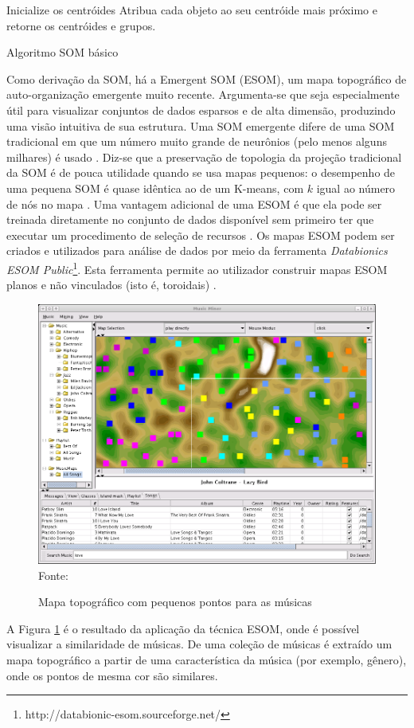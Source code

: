 \begin{algorithm}[!htb]
    \SetAlgoLined
    Inicialize os centróides\;
    Atribua cada objeto ao seu centróide mais próximo e retorne os centróides e grupos.
\caption{Algoritmo SOM básico}
\label{alg:visualizacao}
\end{algorithm}

Como derivação da SOM, há a Emergent SOM (ESOM), um mapa topográfico de auto-organização emergente muito recente. Argumenta-se que seja especialmente útil para visualizar conjuntos de dados esparsos e de alta dimensão, produzindo uma visão intuitiva de sua estrutura. Uma SOM emergente difere de uma SOM tradicional em que um número muito grande de neurônios (pelo menos alguns milhares) é usado \cite{ultsch2005-2}. Diz-se que a preservação de topologia da projeção tradicional da SOM é de pouca utilidade quando se usa mapas pequenos: o desempenho de uma pequena SOM é quase idêntica ao de um K-means, com \textbf{\({k}\)} igual ao número de nós no mapa \cite{ultsch2005}. Uma vantagem adicional de uma ESOM é que ela pode ser treinada diretamente no conjunto de dados disponível sem primeiro ter que executar um procedimento de seleção de recursos \cite{ultsch2003}. Os mapas ESOM podem ser criados e utilizados para análise de dados por meio da ferramenta \textit{Databionics ESOM Public}\footnote{http://databionic-esom.sourceforge.net/ }. Esta ferramenta permite ao utilizador construir mapas ESOM planos e não vinculados (isto é, toroidais) \cite{ultsch2007}.

\begin{figure}[!htb]
   \centering
   \caption{Mapa topográfico com pequenos pontos para as músicas}\label{fig:mapaTopografico}
   \includegraphics[scale=0.40]{figuras/musicminerMap.png}
   \\Fonte: \cite{musicminer}
\end{figure}

A Figura \ref{fig:mapaTopografico} é o resultado da aplicação da técnica ESOM, onde é possível visualizar a similaridade de músicas. De uma coleção de músicas é extraído um mapa topográfico a partir de uma característica da música (por exemplo, gênero), onde os pontos de mesma cor são similares.
